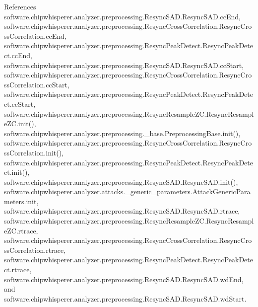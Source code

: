 References software.\+chipwhisperer.\+analyzer.\+preprocessing.\+Resync\+S\+A\+D.\+Resync\+S\+A\+D.\+cc\+End, software.\+chipwhisperer.\+analyzer.\+preprocessing.\+Resync\+Cross\+Correlation.\+Resync\+Cross\+Correlation.\+cc\+End, software.\+chipwhisperer.\+analyzer.\+preprocessing.\+Resync\+Peak\+Detect.\+Resync\+Peak\+Detect.\+cc\+End, software.\+chipwhisperer.\+analyzer.\+preprocessing.\+Resync\+S\+A\+D.\+Resync\+S\+A\+D.\+cc\+Start, software.\+chipwhisperer.\+analyzer.\+preprocessing.\+Resync\+Cross\+Correlation.\+Resync\+Cross\+Correlation.\+cc\+Start, software.\+chipwhisperer.\+analyzer.\+preprocessing.\+Resync\+Peak\+Detect.\+Resync\+Peak\+Detect.\+cc\+Start, software.\+chipwhisperer.\+analyzer.\+preprocessing.\+Resync\+Resample\+Z\+C.\+Resync\+Resample\+Z\+C.\+init(), software.\+chipwhisperer.\+analyzer.\+preprocessing.\+\_\+base.\+Preprocessing\+Base.\+init(), software.\+chipwhisperer.\+analyzer.\+preprocessing.\+Resync\+Cross\+Correlation.\+Resync\+Cross\+Correlation.\+init(), software.\+chipwhisperer.\+analyzer.\+preprocessing.\+Resync\+Peak\+Detect.\+Resync\+Peak\+Detect.\+init(), software.\+chipwhisperer.\+analyzer.\+preprocessing.\+Resync\+S\+A\+D.\+Resync\+S\+A\+D.\+init(), software.\+chipwhisperer.\+analyzer.\+attacks.\+\_\+generic\+\_\+parameters.\+Attack\+Generic\+Parameters.\+init, software.\+chipwhisperer.\+analyzer.\+preprocessing.\+Resync\+S\+A\+D.\+Resync\+S\+A\+D.\+rtrace, software.\+chipwhisperer.\+analyzer.\+preprocessing.\+Resync\+Resample\+Z\+C.\+Resync\+Resample\+Z\+C.\+rtrace, software.\+chipwhisperer.\+analyzer.\+preprocessing.\+Resync\+Cross\+Correlation.\+Resync\+Cross\+Correlation.\+rtrace, software.\+chipwhisperer.\+analyzer.\+preprocessing.\+Resync\+Peak\+Detect.\+Resync\+Peak\+Detect.\+rtrace, software.\+chipwhisperer.\+analyzer.\+preprocessing.\+Resync\+S\+A\+D.\+Resync\+S\+A\+D.\+wd\+End, and software.\+chipwhisperer.\+analyzer.\+preprocessing.\+Resync\+S\+A\+D.\+Resync\+S\+A\+D.\+wd\+Start.


